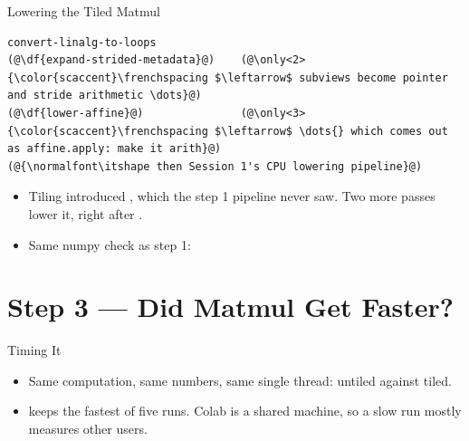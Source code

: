 \documentclass[aspectratio=169,10pt]{beamer}
\begin{document}
\begin{frame}[fragile]{Lowering the Tiled Matmul}
\begin{lstlisting}[style=plain,basicstyle=\ttfamily\scriptsize]
convert-linalg-to-loops
(@\df{expand-strided-metadata}@)    (@\only<2>{\color{scaccent}\frenchspacing $\leftarrow$ subviews become pointer and stride arithmetic \dots}@)
(@\df{lower-affine}@)               (@\only<3>{\color{scaccent}\frenchspacing $\leftarrow$ \dots{} which comes out as affine.apply: make it arith}@)
(@{\normalfont\itshape then Session 1's CPU lowering pipeline}@)
\end{lstlisting}
  \vspace{0.3em}
  \begin{itemize}
    \item<1-> Tiling introduced , which the step 1 pipeline
      never saw. Two more passes lower it, right after
      .
    \item<4-> Same numpy check as step 1:
  \end{itemize}
  \vspace{0.2em}
\end{frame}

\section{Step 3 --- Did Matmul Get Faster?}
\begin{frame}[plain]\sectionpage\end{frame}

\begin{frame}{Timing It}
  \begin{itemize}
    \item<1-> Same computation, same numbers, same single thread: untiled
      against tiled.
    \item<2->  keeps the \alert{fastest} of five runs. Colab is
      a shared machine, so a slow run mostly measures other users.
  \end{itemize}
  \vspace{1em}
\end{frame}
\end{document}
